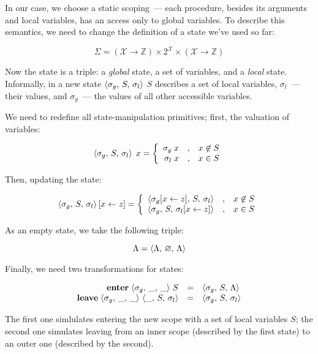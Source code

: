 In our case, we choose a static scoping~--- each procedure, besides its arguments and local variables, has an access
only to global variables.  To describe this semantics, we need to change the definition of a state we've used so far:

\[
\Sigma = (\mathscr X \to \mathbb Z) \times 2^{\mathscr X} \times (\mathscr X \to \mathbb Z)
\]

Now the state is a triple: a \emph{global} state, a set of variables, and a \emph{local} state. Informally, in a new
state $\left<{\sigma_g,\,S,\,\sigma_l}\right>$ $S$ describes a set of local variables, $\sigma_l$~--- their values, and $\sigma_g$~---
the values of all other accessible variables.

We need to redefine all state-manipulation primitives; first, the valuation of variables:

\[
\left<{\sigma_g,\,S,\,\sigma_l}\right>\;x=
  \left\{\begin{array}{rcl}
            \sigma_g\;x & , & x\not\in S\\
            \sigma_l\;x & , & x \in S
         \end{array}
  \right.
\]

Then, updating the state:

\[
\left<{\sigma_g,\,S,\,\sigma_l}\right>[x\gets z] =
  \left\{\begin{array}{rcl}
            \left<{\sigma_g[x\gets z],\,S,\,\sigma_l}\right> & , & x\not\in S\\
            \left<{\sigma_g,\,S,\,\sigma_l[x\gets z]}\right> & , & x \in S
         \end{array}
  \right.
\]

As an empty state, we take the following triple:

\[
\Lambda=\left<{\Lambda,\,\varnothing,\,\Lambda}\right>
\]

Finally, we need two transformations for states:

\[
\begin{array}{rcl}
  \mathbf{enter}\;{\left<{\sigma_g,\,\_,\,\_}\right>\,S} & = & \left<{\sigma_g,\,S,\,\Lambda}\right>\\
  \mathbf{leave}\;{\left<{\sigma_g,\,\_,\,\_}\right>\,\left<{\_,\,S,\,\sigma_l}\right>}& = & \left<{\sigma_g,\,S,\,\sigma_l}\right>
\end{array}
\]

The first one simlulates entering the new scope with a set of local variables $S$; the second one simulates leaving
from an inner scope (described by the first state) to an outer one (described by the second).

